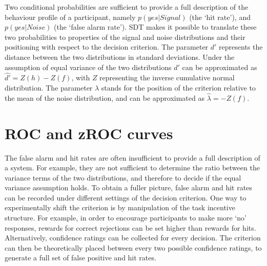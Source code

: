 \documentclass[12pt,twoside]{reedthesis}
\begin{document}
Two conditional probabilities are sufficient to provide a full description of the behaviour profile of a participant, namely \(p(yes|Signal)\) (the `hit rate'), and \(p(yes|Noise)\) (the `false alarm rate'). SDT makes it possible to translate these two probabilities to properties of the signal and noise distributions and their positioning with respect to the decision criterion. The parameter \(d'\) represents the distance between the two distributions in standard deviations. Under the assumption of equal variance of the two distributions \(d'\) can be approximated as \(\hat{d'}=Z(h)-Z(f)\), with \(Z\) representing the inverse cumulative normal distribution. The parameter \(\lambda\) stands for the position of the criterion relative to the mean of the noise distribution, and can be approximated as \(\hat{\lambda}=-Z(f)\).

\hypertarget{app1:ROC}{%
\section{ROC and zROC curves}\label{app1:ROC}}

The false alarm and hit rates are often insufficient to provide a full description of a system. For example, they are not sufficient to determine the ratio between the variance terms of the two distributions, and therefore to decide if the equal variance assumption holds. To obtain a fuller picture, false alarm and hit rates can be recorded under different settings of the decision criterion. One way to experimentally shift the criterion is by manipulation of the task incentive structure. For example, in order to encourage participants to make more `no' responses, rewards for correct rejections can be set higher than rewards for hits. Alternatively, confidence ratings can be collected for every decision. The criterion can then be theoretically placed between every two possible confidence ratings, to generate a full set of false positive and hit rates.
\end{document}

